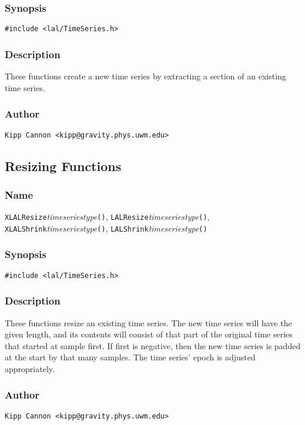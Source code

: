 \subsubsection{Synopsis}

\begin{verbatim}
#include <lal/TimeSeries.h>
\end{verbatim}


\subsubsection{Description}

These functions create a new time series by extracting a section of an
existing time series.

\subsubsection{Author}

\verb|Kipp Cannon <kipp@gravity.phys.uwm.edu>|


\subsection{Resizing Functions}

\subsubsection{Name}

\texttt{XLALResize}\textit{timeseriestype}\texttt{()},
\texttt{LALResize}\textit{timeseriestype}\texttt{()},
\texttt{XLALShrink}\textit{timeseriestype}\texttt{()},
\texttt{LALShrink}\textit{timeseriestype}\texttt{()}

\subsubsection{Synopsis}

\begin{verbatim}
#include <lal/TimeSeries.h>
\end{verbatim}


\subsubsection{Description}

These functions resize an existing time series.  The new time series will
have the given length, and its contents will consist of that part of the
original time series that started at sample first.  If first is negative,
then the new time series is padded at the start by that many samples.  The
time series' epoch is adjusted appropriately.

\subsubsection{Author}

\verb|Kipp Cannon <kipp@gravity.phys.uwm.edu>|
